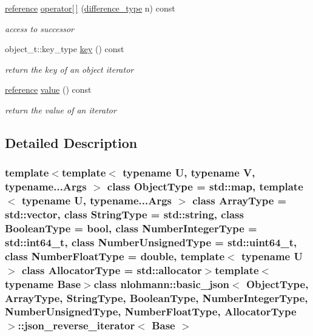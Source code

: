 \begin{DoxyCompactItemize}
\hyperlink{classnlohmann_1_1basic__json_1_1json__reverse__iterator_a7265535f39299824f9712a2ca15013c3}{reference} \hyperlink{classnlohmann_1_1basic__json_1_1json__reverse__iterator_ad4ec2bbb8347e7aa3b58e616fd6c7f40}{operator\mbox{[}$\,$\mbox{]}} (\hyperlink{classnlohmann_1_1basic__json_aec316934a555dd1acdd3600e5d4a4cdf}{difference\+\_\+type} n) const 
\begin{DoxyCompactList}\small\item\em access to successor \end{DoxyCompactList}\item 
object\+\_\+t\+::key\+\_\+type \hyperlink{classnlohmann_1_1basic__json_1_1json__reverse__iterator_acecae6d237fcf14c909fb42b9d2e2955}{key} () const 
\begin{DoxyCompactList}\small\item\em return the key of an object iterator \end{DoxyCompactList}\item 
\hyperlink{classnlohmann_1_1basic__json_1_1json__reverse__iterator_a7265535f39299824f9712a2ca15013c3}{reference} \hyperlink{classnlohmann_1_1basic__json_1_1json__reverse__iterator_aca5116682e206dac48f8a56716a3280b}{value} () const 
\begin{DoxyCompactList}\small\item\em return the value of an iterator \end{DoxyCompactList}\end{DoxyCompactItemize}


\subsection{Detailed Description}
\subsubsection*{template$<$template$<$ typename U, typename V, typename...\+Args $>$ class Object\+Type = std\+::map, template$<$ typename U, typename...\+Args $>$ class Array\+Type = std\+::vector, class String\+Type = std\+::string, class Boolean\+Type = bool, class Number\+Integer\+Type = std\+::int64\+\_\+t, class Number\+Unsigned\+Type = std\+::uint64\+\_\+t, class Number\+Float\+Type = double, template$<$ typename U $>$ class Allocator\+Type = std\+::allocator$>$template$<$typename Base$>$class nlohmann\+::basic\+\_\+json$<$ Object\+Type, Array\+Type, String\+Type, Boolean\+Type, Number\+Integer\+Type, Number\+Unsigned\+Type, Number\+Float\+Type, Allocator\+Type $>$\+::json\+\_\+reverse\+\_\+iterator$<$ Base $>$}

